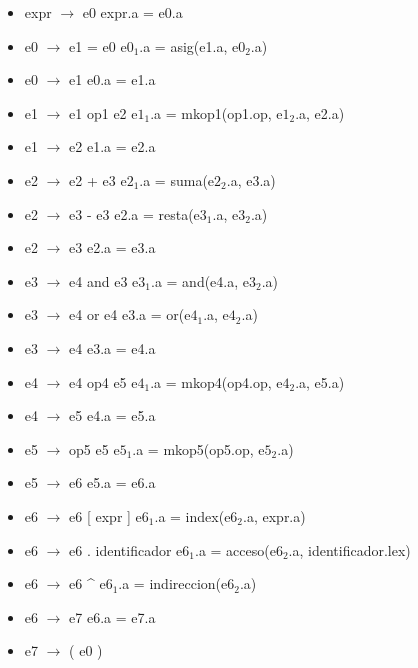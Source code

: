 \documentclass[11pt]{article}
\begin{document}
        \begin{itemize}
            \item expr $\rightarrow$ e0
                \subitem expr.a = e0.a
            \item e0 $\rightarrow$ e1 = e0
                \subitem e$0_1$.a = asig(e1.a, e$0_2$.a)
            \item e0 $\rightarrow$ e1
                \subitem e0.a = e1.a
            \item e1 $\rightarrow$ e1 op1 e2
                \subitem e$1_1$.a = mkop1(op1.op, e$1_2$.a, e2.a)
            \item e1 $\rightarrow$ e2
                \subitem e1.a = e2.a
            \item e2 $\rightarrow$ e2 + e3
                \subitem e$2_1$.a = suma(e$2_2$.a, e3.a)
            \item e2 $\rightarrow$ e3 - e3
                \subitem e2.a = resta(e$3_1$.a, e$3_2$.a)
            \item e2 $\rightarrow$ e3
                \subitem e2.a = e3.a
            \item e3 $\rightarrow$ e4 and e3
                \subitem e$3_1$.a = and(e4.a, e$3_2$.a)
            \item e3 $\rightarrow$ e4 or e4
                \subitem e3.a = or(e$4_1$.a, e$4_2$.a)
            \item e3 $\rightarrow$ e4
                \subitem e3.a = e4.a
            \item e4 $\rightarrow$ e4 op4 e5
                \subitem e$4_1$.a = mkop4(op4.op, e$4_2$.a, e5.a)
            \item e4 $\rightarrow$ e5
                \subitem e4.a = e5.a
            \item e5 $\rightarrow$ op5 e5
                \subitem e$5_1$.a = mkop5(op5.op, e$5_2$.a)
            \item e5 $\rightarrow$ e6
                \subitem e5.a = e6.a
            \item e6 $\rightarrow$ e6 [ expr ]
                \subitem e$6_1$.a = index(e$6_2$.a, expr.a)
            \item e6 $\rightarrow$ e6 . identificador
                \subitem e$6_1$.a = acceso(e$6_2$.a, identificador.lex)
            \item e6 $\rightarrow$ e6 \^{}
                \subitem e$6_1$.a = indireccion(e$6_2$.a)
            \item e6 $\rightarrow$ e7
                \subitem e6.a = e7.a
            \item e7 $\rightarrow$ ( e0 )

\end{itemize}
\end{document}
